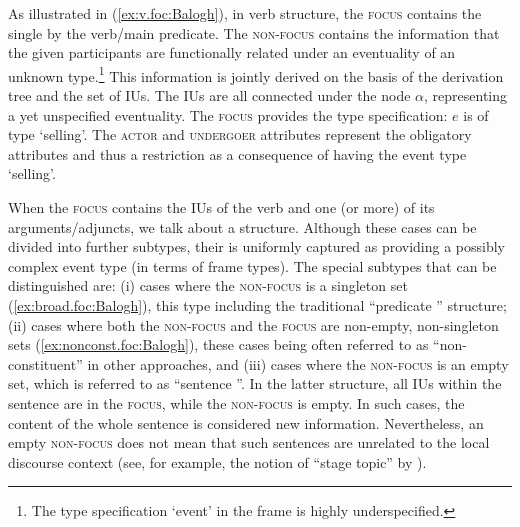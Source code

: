 \documentclass[output=paper,colorlinks,citecolor=brown]{langscibook}
\begin{document}
As illustrated in (\ref{ex:v.foc:Balogh}), in verb  structure, the {\textsc{focus}} contains the single  by the verb/main predicate. The {\textsc{non-focus}} contains the information that the given participants are functionally related under an eventuality of an unknown type.\footnote{The type specification `event' in the frame is highly underspecified.} This information is jointly derived on the basis of the derivation tree and the set of IUs. The IUs are all connected under the node $\alpha$, representing a yet unspecified eventuality. The {\textsc{focus}} provides the type specification: $e$ is of type `selling'. The {\scshape{actor}} and {\scshape{undergoer}} attributes represent the obligatory attributes and thus a restriction as a consequence of having the event type `selling'. 

When the {\textsc{focus}} contains the IUs of the verb and one (or more) of its arguments/adjuncts, we talk about a  structure. Although these cases can be divided into further subtypes, their  is uniformly captured as providing a possibly complex event type (in terms of frame types). The special subtypes that can be distinguished are: (i) cases where the {\textsc{non-focus}} is a singleton set (\ref{ex:broad.foc:Balogh}), this type including the traditional ``predicate '' structure; (ii) cases where both the {\textsc{non-focus}} and the {\textsc{focus}} are non-empty, non-singleton sets (\ref{ex:nonconst.foc:Balogh}), these cases being often referred to as ``non-constituent''  in other approaches, and (iii) cases where the {\textsc{non-focus}} is an empty set, which is referred to as ``sentence ''. In the latter  structure, all IUs within the sentence are in the {\textsc{focus}}, while the {\textsc{non-focus}} is empty. In such cases, the content of the whole sentence is considered new information. Nevertheless, an empty {\textsc{non-focus}} does not mean that such sentences are unrelated to the local discourse context (see, for example, the notion of ``stage topic'' by \citealt{es:07}). 
\end{document}
